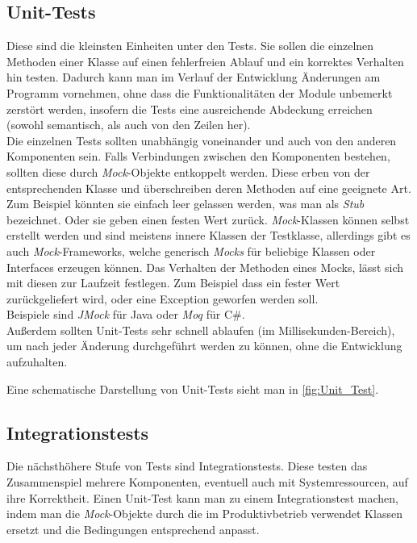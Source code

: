 \subsection{Unit-Tests} 

Diese sind die kleinsten Einheiten unter den Tests. Sie sollen die einzelnen Methoden einer Klasse auf einen fehlerfreien Ablauf und ein korrektes Verhalten hin testen. Dadurch kann man im Verlauf der Entwicklung Änderungen am Programm vornehmen, ohne dass die Funktionalitäten der Module unbemerkt zerstört werden, insofern die Tests eine ausreichende Abdeckung erreichen (sowohl semantisch, als auch von den Zeilen her).\\
Die einzelnen Tests sollten unabhängig voneinander und auch von den anderen Komponenten sein. Falls Verbindungen zwischen den Komponenten bestehen, sollten diese durch \hypertarget{DefinitionMock}{\textit{Mock}}-Objekte entkoppelt werden. Diese erben von der entsprechenden Klasse und überschreiben deren Methoden auf eine geeignete Art. Zum Beispiel könnten sie einfach leer gelassen werden, was man als \textit{Stub} bezeichnet. Oder sie geben einen festen Wert zurück. \textit{Mock}-Klassen können selbst erstellt werden und sind meistens innere Klassen der Testklasse, allerdings gibt es auch \textit{Mock}-Frameworks, welche generisch \textit{Mocks} für beliebige Klassen oder Interfaces erzeugen können. Das Verhalten der Methoden eines Mocks, lässt sich mit diesen zur Laufzeit festlegen. Zum Beispiel dass ein fester Wert zurückgeliefert wird, oder eine Exception geworfen werden soll.\\ Beispiele sind \textit{JMock} für Java oder \textit{Moq} für C\#.\\
Außerdem sollten Unit-Tests sehr schnell ablaufen (im Millisekunden-Bereich), um nach jeder Änderung durchgeführt werden zu können, ohne die Entwicklung aufzuhalten.

Eine schematische Darstellung von Unit-Tests sieht man in \autoref{fig:Unit_Test}.

\subsection{Integrationstests}

Die nächsthöhere Stufe von Tests sind Integrationstests. Diese testen das Zusammenspiel mehrere Komponenten, eventuell auch mit Systemressourcen, auf ihre Korrektheit. Einen Unit-Test kann man zu einem Integrationstest machen, indem man die \textit{Mock}-Objekte durch die im Produktivbetrieb verwendet Klassen ersetzt und die Bedingungen entsprechend anpasst.

